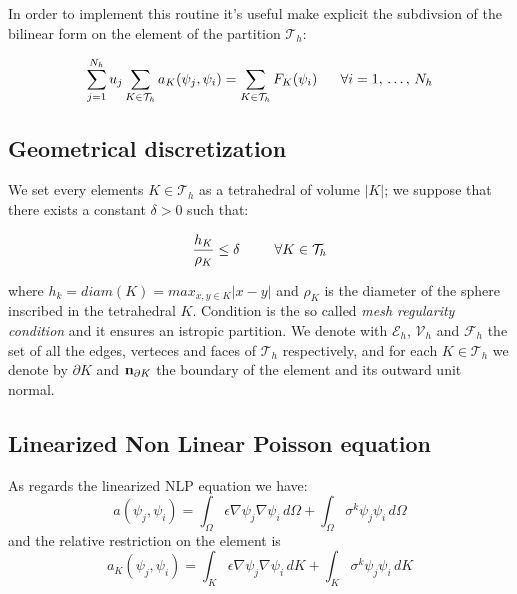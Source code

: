 In order to implement this routine it's useful make explicit the subdivsion of the bilinear form on the element of the partition $\mathcal{T}_h$:

\begin{equation}
\sum_{j=1}^{N_h}u_j\sum_{K\in \mathcal{T}_h}a_K(\psi_j,\psi_i) = \sum_{K\in \mathcal{T}_h}F_K(\psi_i) \psp{10} \forall i = 1, \, . \, . \, . \, , \, N_h
\end{equation}


\subsection{Geometrical discretization}

We set every elements $K\in \mathcal{T}_h$ as a tetrahedral of volume $|K|$; we suppose that there exists a constant $\delta>0$ such that:

\begin{equation}
\label{eq: mesh regular condition}
\dfrac{h_K}{\rho_K} \leq \delta \psp{15} \forall K \in \mathcal{T}_h
\end{equation}

where $h_k=diam(K)=max_{x,y\in K}|x-y|$ and $\rho_K$ is the diameter of the sphere inscribed in the tetrahedral $K$. Condition  is the so called \textit{mesh regularity condition} \cite{quarteroni:modnum} and it ensures an istropic partition.
We denote with $\mathcal{E}_h$, $\mathcal{V}_h$ and $\mathcal{F}_h$ the set of all the edges, verteces and faces  
of $\mathcal{T}_h$ respectively, and for each $K\in \mathcal{T}_h$ we denote by $\partial K$ and $\mathbf{n}_{\partial K}$ the boundary of the element and its outward unit normal.
  
 
 \subsection{Linearized Non Linear Poisson equation}

As regards the linearized NLP equation we have:
\begin{equation}
a(\psi_j,\psi_i)  = \int_{\Omega} \epsilon \nabla \psi_j \nabla \psi_i \, d\Omega + \int_{\Omega} \sigma^{k}\psi_j \psi_i \, d\Omega 
\end{equation}
and the relative restriction on the element is
\begin{equation}
\label{eq: bilinear local discrete}
a_K(\psi_j,\psi_i)  = \int_{K} \epsilon \nabla \psi_j \nabla \psi_i \, dK + \int_{K} \sigma^{k}\psi_j \psi_i \, dK
\end{equation}

